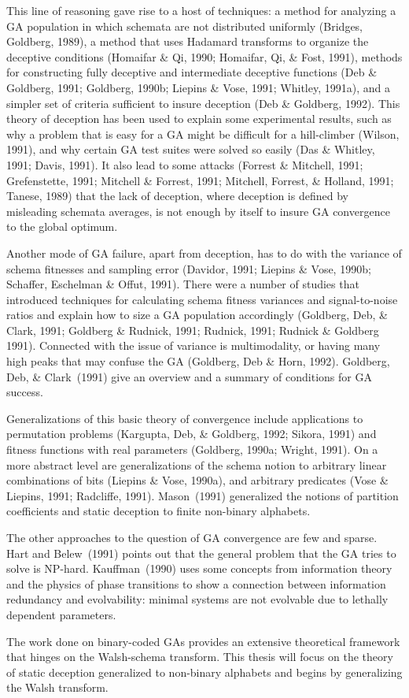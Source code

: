 This line of reasoning gave rise to a host of techniques:
a method for analyzing a GA population in which schemata are not
distributed uniformly (Bridges, Goldberg, 1989),
a method that uses Hadamard transforms to organize the deceptive conditions
(Homaifar \& Qi, 1990; Homaifar, Qi, \& Fost, 1991),
methods for constructing fully deceptive and intermediate deceptive
functions (Deb \& Goldberg, 1991; Goldberg, 1990b; Liepins \& Vose, 1991;
Whitley, 1991a), and a simpler set of criteria sufficient to
insure deception (Deb \& Goldberg, 1992).
This theory of deception has been used to explain some experimental
results, such as why a problem that is easy for a GA might be difficult
for a hill-climber (Wilson, 1991), and why certain GA test suites were
solved so easily (Das \& Whitley, 1991; Davis, 1991).
It also lead to some attacks 
(Forrest \& Mitchell, 1991; Grefenstette, 1991; Mitchell \& Forrest, 1991; 
Mitchell, Forrest, \& Holland, 1991; Tanese, 1989) that the lack of deception,
where
deception is defined by misleading schemata averages, is not enough by itself
to insure GA convergence to the global optimum.

Another mode of GA failure, apart from deception, has to do with the
variance of schema fitnesses and sampling error
(Davidor, 1991; Liepins \& Vose, 1990b; Schaffer, Eschelman \& Offut, 1991).
There were a number of studies that introduced techniques
for calculating schema fitness variances and 
signal-to-noise ratios and explain how to size a GA population accordingly
(Goldberg, Deb, \& Clark, 1991; Goldberg \& Rudnick, 1991;
Rudnick, 1991; Rudnick \& Goldberg 1991).
Connected with the issue of variance is multimodality, or having many
high peaks that may confuse the GA (Goldberg, Deb \& Horn, 1992).
Goldberg, Deb, \& Clark~(1991) give an overview and a summary of
conditions for GA success.

Generalizations of this basic theory of convergence include applications
to permutation problems 
(Kargupta, Deb, \& Goldberg, 1992; Sikora, 1991)
and fitness functions with real parameters (Goldberg, 1990a;
Wright, 1991).
On a more abstract level are generalizations of the schema notion to arbitrary
linear combinations of bits (Liepins \& Vose, 1990a), and arbitrary
predicates (Vose \& Liepins, 1991; Radcliffe, 1991).
Mason~(1991) generalized the notions of partition coefficients and
static deception to finite non-binary alphabets.

The other approaches to the question of GA convergence are few and
sparse.
Hart and Belew~(1991) points out that the general problem that the GA
tries to solve is NP-hard.
Kauffman~(1990) uses some concepts from information theory and
the physics of phase transitions to show a connection between
information redundancy and evolvability: minimal systems are not
evolvable due to lethally dependent parameters.

The work done on binary-coded GAs provides an extensive theoretical
framework that hinges on the Walsh-schema transform.
This thesis will focus on the theory of static deception generalized
to non-binary alphabets and begins by generalizing the Walsh transform.

